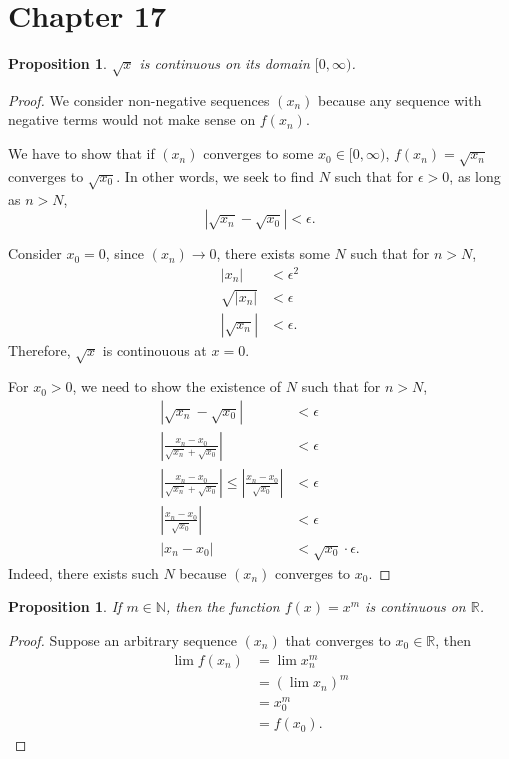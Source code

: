 \documentclass{article}
\newtheorem{proposition}[thm]{Proposition}
\begin{document}
\section*{Chapter 17}
\begin{proposition}
    $\sqrt{x}$ is continuous on its domain $[0,\infty)$.
\end{proposition}
\begin{proof}
    We consider non-negative sequences $(x_n)$ because any sequence with negative terms would not 
    make sense on $f(x_n)$.
    
    We have to show that if $(x_n)$ converges to some $x_0\in[0, \infty)$, $f(x_n)=\sqrt{x_n}$ 
    converges to $\sqrt{x_0}$. In other words, we seek to find $N$ such that for $\epsilon>0$, as 
    long as $n>N$,
    $$|\sqrt{x_n}-\sqrt{x_0}|<\epsilon.$$
    
    Consider $x_0=0$, since $(x_n)\to 0$, there exists some $N$ such that for $n>N$,
    \begin{align*}
        |x_n| & < \epsilon^2 \\
        \sqrt{|x_n|} & < \epsilon \\
        |\sqrt{x_n}| & < \epsilon.
    \end{align*}
    Therefore, $\sqrt{x}$ is continouous at $x=0$.

    For $x_0>0$, we need to show the existence of $N$ such that for $n>N$,
    \begin{align*}
        |\sqrt{x_n}-\sqrt{x_0}| & < \epsilon \\
        \left|\frac{x_n-x_0}{\sqrt{x_n}+\sqrt{x_0}}\right| & < \epsilon \\
        \left|\frac{x_n-x_0}{\sqrt{x_n}+\sqrt{x_0}}\right| \le 
        \left|\frac{x_n-x_0}{\sqrt{x_0}}\right| & < \epsilon \\
        \left|\frac{x_n-x_0}{\sqrt{x_0}}\right| & < \epsilon \\
        \left|{x_n-x_0}\right| & < \sqrt{x_0}\cdot \epsilon.
    \end{align*}
    Indeed, there exists such $N$ because $(x_n)$ converges to $x_0$.
\end{proof}

\begin{proposition}
    If $m\in \mathbb{N}$, then the function $f(x)=x^m$ is continuous on $\mathbb{R}$.
\end{proposition}
\begin{proof}
    Suppose an arbitrary sequence $(x_n)$ that converges to $x_0\in\mathbb{R}$, then 
    \begin{align*}
        \lim f(x_n) & = \lim x_n^m \\
        & = (\lim x_n)^m \\
        & = x_0^m \\
        & = f(x_0).
    \end{align*}
\end{proof}
\end{document}
